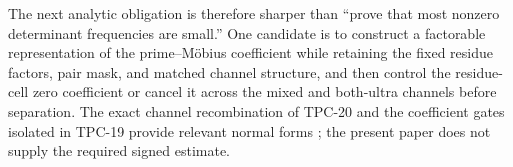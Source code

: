 The next analytic obligation is therefore sharper than ``prove that
most nonzero determinant frequencies are small.''  One candidate is
to construct a factorable representation of the prime--M\"obius
coefficient while retaining the fixed residue factors, pair mask, and
matched channel structure, and then control the residue-cell zero
coefficient or cancel it across the mixed and both-ultra channels
before separation.  The exact channel
recombination of TPC-20 and the coefficient gates isolated in TPC-19
provide relevant normal forms \citep{WangTPC19,WangTPC20}; the present
paper does not supply the required signed estimate.
